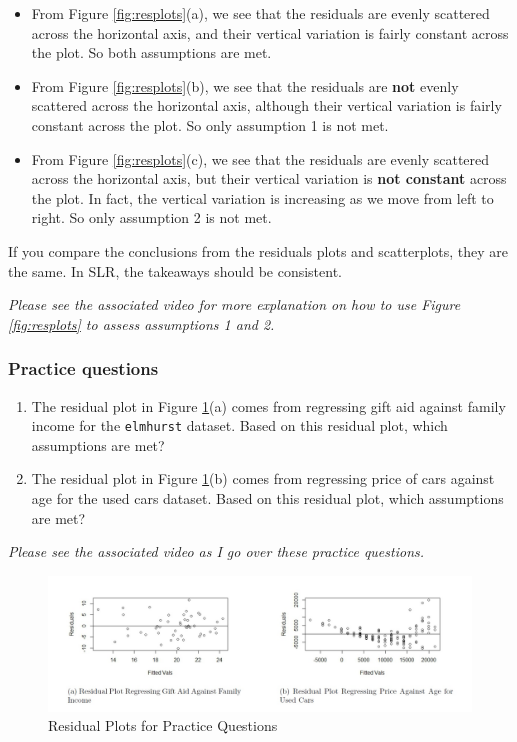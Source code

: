 \documentclass[
]{book}
\providecommand{\tightlist}{%
  \setlength{\itemsep}{0pt}\setlength{\parskip}{0pt}}
\begin{document}
\begin{itemize}
\tightlist
\item
  From Figure \ref{fig:resplots}(a), we see that the residuals are evenly scattered across the horizontal axis, and their vertical variation is fairly constant across the plot. So both assumptions are met.
\item
  From Figure \ref{fig:resplots}(b), we see that the residuals are \textbf{not} evenly scattered across the horizontal axis, although their vertical variation is fairly constant across the plot. So only assumption 1 is not met.
\item
  From Figure \ref{fig:resplots}(c), we see that the residuals are evenly scattered across the horizontal axis, but their vertical variation is \textbf{not constant} across the plot. In fact, the vertical variation is increasing as we move from left to right. So only assumption 2 is not met.
\end{itemize}

If you compare the conclusions from the residuals plots and scatterplots, they are the same. In SLR, the takeaways should be consistent.

\emph{Please see the associated video for more explanation on how to use Figure \ref{fig:resplots} to assess assumptions 1 and 2.}

\hypertarget{practice-questions-2}{%
\subsubsection{Practice questions}\label{practice-questions-2}}

\begin{enumerate}
\def\labelenumi{\arabic{enumi}.}
\item
  The residual plot in Figure \ref{fig:practice}(a) comes from regressing gift aid against family income for the \texttt{elmhurst} dataset. Based on this residual plot, which assumptions are met?
\item
  The residual plot in Figure \ref{fig:practice}(b) comes from regressing price of cars against age for the used cars dataset. Based on this residual plot, which assumptions are met?
\end{enumerate}

\emph{Please see the associated video as I go over these practice questions.}

\begin{figure}
\centering
\includegraphics{images/practice.jpg}
\caption{\label{fig:practice}Residual Plots for Practice Questions}
\end{figure}
\end{document}
